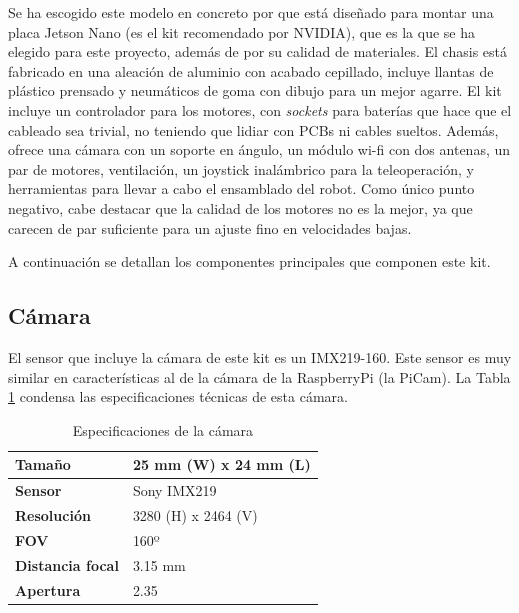 Se ha escogido este modelo en concreto por que está diseñado para montar una placa Jetson Nano (es el kit recomendado por NVIDIA), que es la que se ha elegido para este proyecto, además de por su calidad de materiales. El chasis está fabricado en una aleación de aluminio con acabado cepillado, incluye llantas de plástico prensado y neumáticos de goma con dibujo para un mejor agarre. El kit incluye un controlador para los motores, con \textit{sockets} para baterías que hace que el cableado sea trivial, no teniendo que lidiar con PCBs ni cables sueltos. Además, ofrece una cámara con un soporte en ángulo, un módulo wi-fi con dos antenas, un par de motores, ventilación, un joystick inalámbrico para la teleoperación, y herramientas para llevar a cabo el ensamblado del robot. Como único punto negativo, cabe destacar que la calidad de los motores no es la mejor, ya que carecen de par suficiente para un ajuste fino en velocidades bajas.

A continuación se detallan los componentes principales que componen este kit.

\subsection{Cámara}

El sensor que incluye la cámara de este kit es un IMX219-160. Este sensor es muy similar en características al de la cámara de la RaspberryPi (la PiCam). La Tabla \ref{tab:camera} condensa las especificaciones técnicas de esta cámara.

\begin{table}[H]
\centering
\captionsetup[table]{name=New Table Name}

\begin{tabular}{l|l} \hline

\textbf{Tamaño}\cellcolor[HTML]{EFEFEF} & 25 mm (W) x 24 mm (L) \\ \hline
\textbf{Sensor}\cellcolor[HTML]{EFEFEF} & Sony IMX219 \\ \hline
\textbf{Resolución}\cellcolor[HTML]{EFEFEF} & 3280 (H) x 2464 (V) \\ \hline
\textbf{FOV}\cellcolor[HTML]{EFEFEF} & 160º \\ \hline
\textbf{Distancia focal}\cellcolor[HTML]{EFEFEF} & 3.15 mm\\ \hline
\textbf{Apertura}\cellcolor[HTML]{EFEFEF} & 2.35\\ \hline
\end{tabular}
\caption{Especificaciones de la cámara}
\label{tab:camera}
\end{table}

